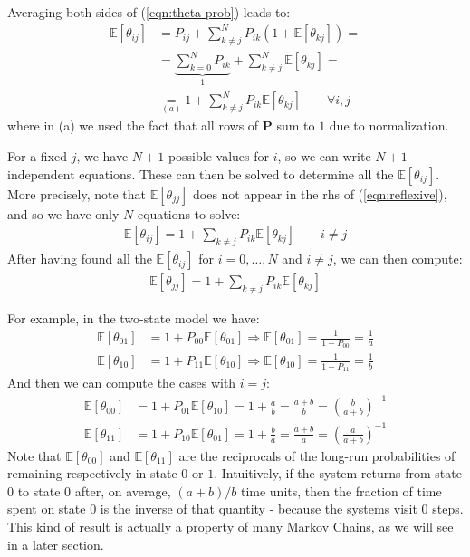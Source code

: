 \documentclass[../template.tex]{subfiles}
\begin{document}
\medskip

Averaging both sides of (\ref{eqn:theta-prob}) leads to:
\begin{align}\nonumber
    \mathbb{E}[\theta_{ij}] &= P_{ij} + \sum_{k \neq j}^N P_{ik} ( 1 + \mathbb{E}[\theta_{kj}]) =\\ \nonumber
    &= \underbrace{\sum_{k=0}^N P_{ik}}_{1}  + \sum_{k\neq j}^N \mathbb{E}[\theta_{kj}] = \\
    &\underset{(a)}{=}  1+ \sum_{k \neq j}^N P_{ik} \mathbb{E}[\theta_{kj}] \qquad \forall i, j \label{eqn:reflexive}
\end{align}
where in (a) we used the fact that all rows of \textbf{P} sum to $1$ due to normalization.  

\medskip

For a fixed $j$, we have $N+1$ possible values for $i$, so we can write $N+1$ independent equations. These can then be solved to determine all the $\mathbb{E}[\theta_{ij}]$. More precisely, note that $\mathbb{E}[\theta_{jj}]$ does not appear in the rhs of (\ref{eqn:reflexive}), and so we have only $N$ equations to solve:
\begin{align*}
    \mathbb{E}[\theta_{ij}] = 1+ \sum_{k \neq j} P_{ik} \mathbb{E}[\theta_{kj}] \qquad i \neq j
\end{align*}
After having found all the $\mathbb{E}[\theta_{ij}]$ for $i=0, \dots, N$ and $i\neq j$, we can then compute:
\begin{align*}
    \mathbb{E}[\theta_{jj}] = 1 + \sum_{k \neq j} P_{ik} \mathbb{E}[\theta_{kj}]
\end{align*}

\medskip

For example, in the two-state model we have:
\begin{align*}
    \mathbb{E}[\theta_{01}] &= 1 + P_{00} \mathbb{E}[\theta_{01}] \Rightarrow \mathbb{E}[\theta_{01}] = \frac{1}{1 - P_{00}} = \frac{1}{a}\\
    \mathbb{E}[\theta_{10}] &= 1 + P_{11} \mathbb{E}[\theta_{10}] \Rightarrow \mathbb{E}[\theta_{10}] = \frac{1}{1- P_{11}} = \frac{1}{b}
\end{align*}
And then we can compute the cases with $i=j$:
\begin{align*}
    \mathbb{E}[\theta_{00}] &= 1+ P_{01} \mathbb{E}[\theta_{10}] = 1 + \frac{a}{b} = \frac{a+b}{b} = \left(\frac{b}{a+b} \right)^{-1}\\
    \mathbb{E}[\theta_{11}] &= 1+P_{10} \mathbb{E}[\theta_{01}] = 1 + \frac{b}{a} = \frac{a+b}{a} = \left(\frac{a}{a+b} \right)^{-1}
\end{align*}
Note that $\mathbb{E}[\theta_{00}]$ and $\mathbb{E}[\theta_{11}]$ are the reciprocals of the long-run probabilities of remaining respectively in state $0$ or $1$. Intuitively, if the system returns from state $0$ to state $0$ after, on average, $(a+b)/b$ time units, then the fraction of time spent on state $0$ is the inverse of that quantity - because the systems visit $0$  steps. This kind of result is actually a property of many Markov Chains, as we will see in a later section.
\end{document}
